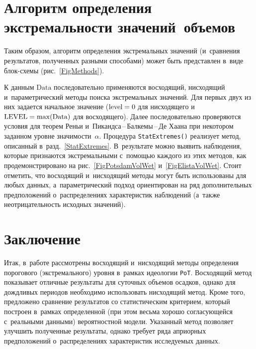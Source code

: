 \begin{multicols}{2}
\vspace*{-6pt}

\section{Алгоритм определения экстремальности значений~объемов}

Таким образом, алгоритм определения экстремальных значений 
(и~сравнения результатов, полученных разными способами) может быть пред\-став\-лен в~виде 
 блок-схе\-мы (рис.~\ref{FigMethods}).



К данным $\mathrm{Data}$ последовательно применяются восходящий, 
нисходящий и~параметрический методы поиска экстремальных значений. 
Для первых двух из них задается начальное значение ($\mathrm{level}\hm=0$ для нисходящего 
и~$\mathrm{LEVEL}\hm=\max(\mathrm{Data})$ для восходящего). Далее последовательно проверяются 
условия для теорем Реньи и~Пи\-канд\-са\,--\,Бал\-ке\-мы\,--\,Де Хаана при 
некотором заданном уровне зна\-чи\-мости~$\alpha$. Процедура \verb"StatExtremes()" 
реализует метод, описанный в~разд.~\ref{StatExtremes}. 
В~результате можно выявить наблюдения, которые признаются экстремальными с~помощью 
каждого из этих методов, как продемонстрировано на рис.~\ref{FigPotsdamVolWet} 
и~\ref{FigElistaVolWet}. Стоит отметить, что восходящий и~нисходящий методы 
могут быть использованы для любых данных, а~па\-ра\-мет\-ри\-че\-ский подход ориентирован 
на ряд дополнительных предположений о~распределениях характеристик наблюдений 
(а~также неотрицательность исходных значений).


\section{Заключение}

\vspace*{-1pt}

Итак, в~работе рассмотрены восходящий и~нисходящий методы определения 
порогового (экстремального) уровня в~рамках идеологии \verb"PoT". 
Восходящий метод показывает отличные результаты для суточных объемов осадков, 
однако для дождливых периодов необходимо использовать нисходящий метод. 
Кроме того, предложено сравнение результатов со статистическим критерием, 
который построен в~рамках определенной (при этом весьма хорошо 
согласующейся с~реальными данными) вероятностной модели. 
Указанный метод позволяет улучшить полученные результаты, однако требует ряда 
априорных предположений о~распределениях характеристик исследуемых данных.


\end{multicols}
